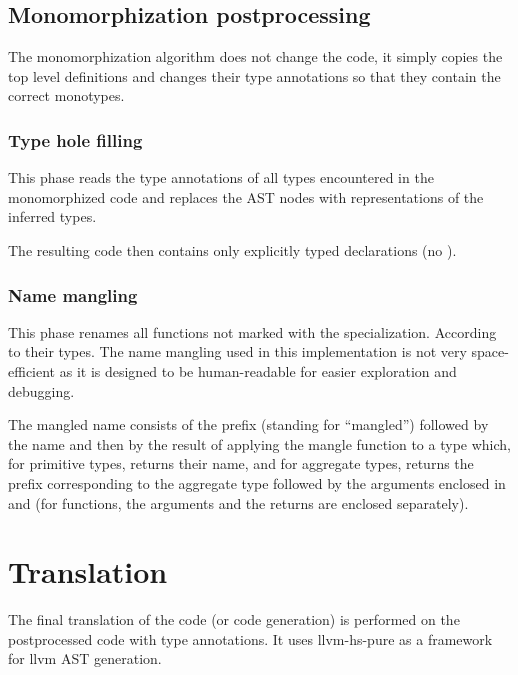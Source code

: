 

\subsection{Monomorphization postprocessing}

The monomorphization algorithm does not change the code, it simply copies the top level definitions and changes their type annotations so that they contain the correct monotypes.

\subsubsection{Type hole filling}

This phase reads the type annotations of all types encountered in the monomorphized code and replaces the AST nodes with representations of the inferred types.

The resulting code then contains only explicitly typed declarations (no ).

\subsubsection{Name mangling}

This phase renames all functions not marked with the  specialization. According to their types. The name mangling used in this implementation is not very space-efficient as it is designed to be human-readable for easier exploration and debugging.

\begin{defn}
    The mangled name consists of the  prefix (standing for ``mangled'') followed by the name and then by the result of applying the mangle function to a type which, for primitive types, returns their name, and for aggregate types, returns the prefix corresponding to the aggregate type followed by the arguments enclosed in  and  (for functions, the arguments and the returns are enclosed separately).
\end{defn}



\section{Translation}

The final translation of the code (or code generation) is performed on the postprocessed code with type annotations. It uses  llvm-hs-pure as a framework for llvm AST generation.

